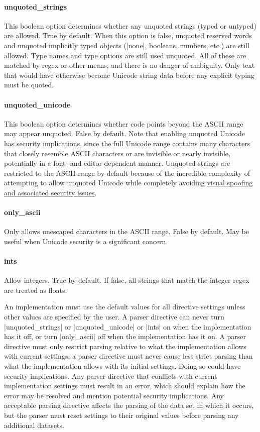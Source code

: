 \documentclass[11pt]{article}
\begin{document}
{{\paragraph{unquoted\_strings}
This boolean option determines whether any unquoted strings (typed or untyped) are allowed.  True by default.  When this option is false, unquoted reserved words and unquoted implicitly typed objects (|none|, booleans, numbers, etc.) are still allowed.  Type names and type options are still used unquoted.  All of these are matched by regex or other means, and there is no danger of ambiguity.  Only text that would have otherwise become Unicode string data before any explicit typing must be quoted.

\paragraph{unquoted\_unicode}
This boolean option determines whether code points beyond the ASCII range may appear unquoted.  False by default.  Note that enabling unquoted Unicode has security implications, since the full Unicode range contains many characters that closely resemble ASCII characters or are invisible or nearly invisible, potentially in a font- and editor-dependent manner.  Unquoted strings are restricted to the ASCII range by default because of the incredible complexity of attempting to allow unquoted Unicode while completely avoiding \href{http://unicode.org/reports/tr36/}{visual spoofing and associated security issues}.

\paragraph{only\_ascii}  Only allows unescaped characters in the ASCII range.  False by default.  May be useful when Unicode security is a significant concern.

\paragraph{ints}  Allow integers.  True by default.  If false, all strings that match the integer regex are treated as floats.

An implementation must use the default values for all directive settings unless other values are specified by the user.  A parser directive can never turn |unquoted_strings| or |unquoted_unicode| or |ints| on when the implementation has it off, or turn |only_ascii| off when the implementation has it on.  A parser directive must only restrict parsing relative to what the implementation allows with current settings; a parser directive must never cause less strict parsing than what the implementation allows with its initial settings.  Doing so could have security implications.  Any parser directive that conflicts with current implementation settings must result in an error, which should explain how the error may be resolved and mention potential security implications.  Any acceptable parsing directive affects the parsing of the data set in which it occurs, but the parser must reset settings to their original values before parsing any additional datasets.

}}
\end{document}
